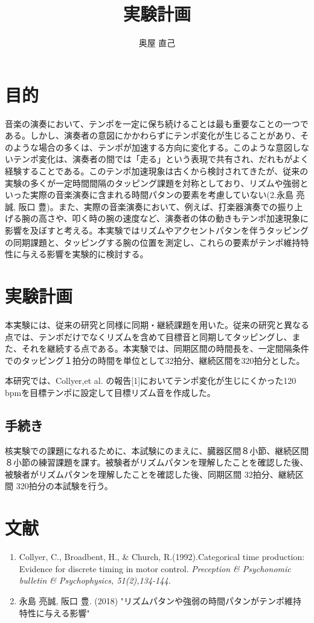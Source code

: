 \documentclass{jsarticle}
\title{実験計画}
\author{奥屋 直己}
\begin{document}
\maketitle

\section{目的}
音楽の演奏において、テンポを一定に保ち続けることは最も重要なことの一つである。しかし、演奏者の意図にかかわらずにテンポ変化が生じることがあり、そのような場合の多くは、テンポが加速する方向に変化する。このような意図しないテンポ変化は、演奏者の間では「走る」という表現で共有され、だれもがよく経験することである。このテンポ加速現象は古くから検討されてきたが、従来の実験の多くが一定時間間隔のタッピング課題を対称としており、リズムや強弱といった実際の音楽演奏に含まれる時間パタンの要素を考慮していない(2.永島 亮誠, 阪口 豊)。また、実際の音楽演奏において、例えば、打楽器演奏での振り上げる腕の高さや、叩く時の腕の速度など、演奏者の体の動きもテンポ加速現象に影響を及ぼすと考える。本実験ではリズムやアクセントパタンを伴うタッピングの同期課題と、タッピングする腕の位置を測定し、これらの要素がテンポ維持特性に与える影響を実験的に検討する。

\section{実験計画}
本実験には、従来の研究と同様に同期・継続課題を用いた。従来の研究と異なる点では、テンポだけでなくリズムを含めて目標音と同期してタッピングし、また、それを継続する点である。本実験では、同期区間の時間長を、一定間隔条件でのタッピング１拍分の時間を単位として32拍分、継続区間を320拍分とした。

本研究では、Collyer,et al. の報告[1]においてテンポ変化が生じにくかった120 bpmを目標テンポに設定して目標リズム音を作成した。
\subsection{手続き}
核実験での課題になれるために、本試験にのまえに、臓器区間８小節、継続区間８小節の練習課題を課す。被験者がリズムパタンを理解したことを確認した後、被験者がリズムパタンを理解したことを確認した後、同期区間 32拍分、継続区間 320拍分の本試験を行う。

\section{文献}
\begin{enumerate}
  \item Collyer, C., Broadbent, H., \& Church, R.(1992).Categorical time production: Evidence for discrete timing in motor control. {\it Preception \& Psychonomic bulletin \& Psychophysics, 51(2),134-144.}
  \item 永島 亮誠, 阪口 豊. (2018) "リズムパタンや強弱の時間パタンがテンポ維持特性に与える影響"
\end{enumerate}
\end{document}
